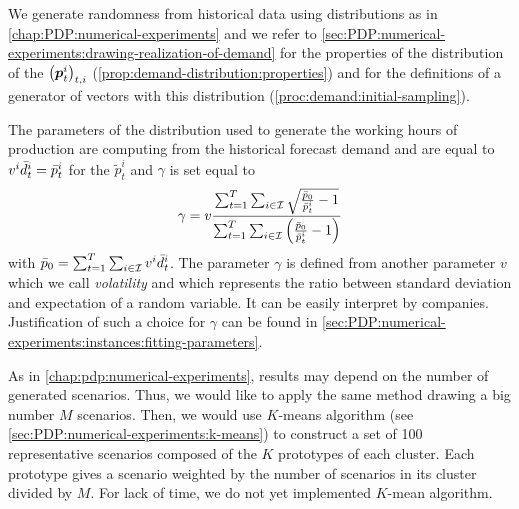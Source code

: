 We generate randomness from historical data using \distrib distributions as in \cref{chap:PDP:numerical-experiments} and we refer to \cref{sec:PDP:numerical-experiments:drawing-realization-of-demand} for the properties of the distribution of the $\bracket{\va p_t^i}_{t,i}$ (\cref{prop:demand-distribution:properties}) and for the definitions of a generator of vectors with this distribution (\cref{proc:demand:initial-sampling}).


The parameters of the \distrib distribution used to generate the working hours of production are computing from the historical forecast demand and are equal to $v^i\bar{d}_t^i=\bar{p}_t^i$ for the $\tilde{p}_t^i$ and $\gamma$ is set equal to
\begin{equation}
  \gamma
  =
  v\frac
  {\sum_{t=1}^{\horizon}\sum_{i\in\REF} \sqrt{\frac{\bar{p}_0}{\bar{p}_t^i}-1}}
  {\sum_{t=1}^{\horizon}\sum_{i\in\REF} \bracket{\frac{\bar{p}_0}{\bar{p}_t^i}-1}}
\end{equation}
with $\bar{p}_0 = \sum_{t=1}^{T}\sum_{i\in\mathcal{I}}v^i\bar{d}_t^i$.
The parameter $\gamma$ is defined from another parameter $v$ which we call \emph{volatility} and which represents the ratio between standard deviation and expectation of a random variable.
It can be easily interpret by companies.
Justification of such a choice for $\gamma$ can be found in \cref{sec:PDP:numerical-experiments:instances:fitting-parameters}.



\medskip


As in \cref{chap:pdp:numerical-experiments}, results may depend on the number of generated scenarios.
Thus, we would like to apply the same method drawing a big number $M$ scenarios.
Then, we would use $K$-means algorithm (see \cref{sec:PDP:numerical-experiments:k-means}) to construct a set of 100 representative scenarios composed of the $K$ prototypes of each cluster.
Each prototype gives a scenario weighted by the number of scenarios in its cluster divided by $M$.
For lack of time, we do not yet implemented $K$-mean algorithm.



